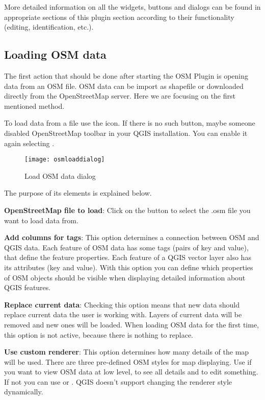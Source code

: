 More detailed information on all the widgets, buttons and dialogs can be
found in appropriate sections of this plugin section according to their
functionality (editing, identification, etc.).

\subsection{Loading OSM data}

The first action that should be done after starting the OSM Plugin is
opening data from an OSM file. OSM data can be import as shapefile or
downloaded directly from the OpenStreetMap server. Here we are focusing
on the first mentioned method.

To load data from a file use the 
icon. If there is no such button, maybe someone disabled OpenStreetMap
toolbar in your QGIS installation. You can enable it again selecting
 \arrow {} \arrow {}.

\begin{figure}[ht]
   \centering
   \texttt{[image: osmloaddialog]}
   \caption{Load OSM data dialog \nixcaption}\label{fig:osmload}
\end{figure}

The purpose of its elements is explained below.

\begin{description}
\item \textbf{OpenStreetMap file to load}: Click on the button to select
the .osm file you want to load data from.
\item \textbf{Add columns for tags}: This option determines a connection
between OSM and QGIS data. Each feature of OSM data has
some tags (pairs of key and value), that define the feature properties.
Each feature of a QGIS vector layer also has its attributes (key and value).
With this option you can define which properties of OSM objects should
be visible when displaying detailed information about QGIS features.
\item \textbf{Replace current data}: Checking this option means that
new data should replace current data the user is working with. Layers of
current data will be removed and new ones will be loaded. When loading
OSM data for the first time, this option is not active, because there is
nothing to replace.
\item \textbf{Use custom renderer}: This option determines how many details
of the map will be used. There are three pre-defined OSM styles for map
displaying. Use  if you want to view OSM data at low level,
to see all details and to edit something. If not you can use
 or . QGIS \CURRENT doesn't
support changing the renderer style dynamically.
\end{description}

